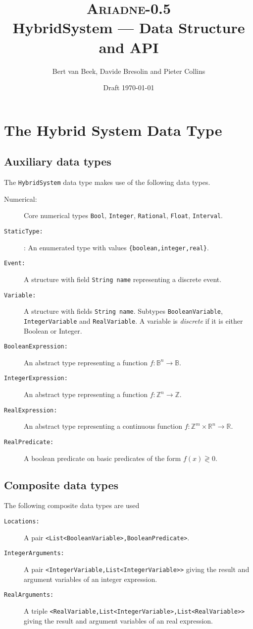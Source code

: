 \documentclass[a4paper,11pt]{article}
\title{\textsc{\Large Ariadne-0.5}\\[\baselineskip]HybridSystem --- Data Structure and API}
\author{Bert van Beek, Davide Bresolin and Pieter Collins}
\date{Draft \today}
\newcommand{\B}{\mathbb{B}}
\newcommand{\Z}{\mathbb{Z}}
\newcommand{\R}{\mathbb{R}}
\begin{document}
\maketitle

\newpage




\section{The Hybrid System Data Type}

\subsection*{Auxiliary data types}

The \texttt{HybridSystem} data type makes use of the following data types.
\begin{description}
 \item[\rm Numerical:] Core numerical types \texttt{Bool}, \texttt{Integer}, \texttt{Rational}, \texttt{Float}, \texttt{Interval}.
 \item[\tt StaticType:]: An enumerated type with values \texttt{\{boolean,integer,real\}}.
 \item[\tt Event:] A structure with field \texttt{String name} representing a discrete event.
 \item[\tt Variable:] A structure with fields \texttt{String name}. Subtypes \texttt{BooleanVariable}, \texttt{IntegerVariable} and \texttt{RealVariable}. A variable is \emph{discrete} if it is either Boolean or Integer.
 \item[\tt BooleanExpression:] An abstract type representing a function $f:\B^n\longrightarrow\B$.
 \item[\tt IntegerExpression:] An abstract type representing a function $f:\Z^n\longrightarrow\Z$.
 \item[\tt RealExpression:] An abstract type representing a continuous function $f:\Z^m\times\R^n\longrightarrow\R$.
 \item[\tt RealPredicate:] A boolean predicate on basic predicates of the form $f(x)\gtrless0$.
\end{description}

\subsection*{Composite data types}
The following composite data types are used

\begin{description}
 \item[\tt Locations:] A pair \texttt{<List<BooleanVariable>,BooleanPredicate>}.
 \item[\tt IntegerArguments:] A pair \texttt{<IntegerVariable,List<IntegerVariable>>} giving the result and argument variables of an integer expression.
 \item[\tt RealArguments:] A triple \texttt{<RealVariable,List<IntegerVariable>,List<RealVariable>>} giving the result and argument variables of an real expression.
\end{description}
\end{document}
